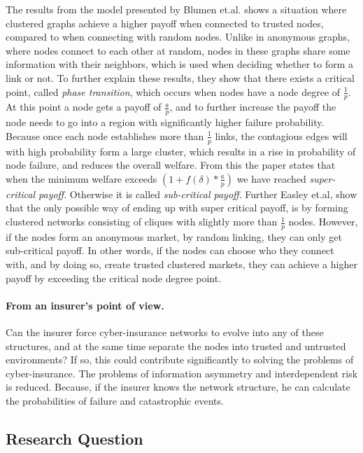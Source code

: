 The results from the model presented by Blumen et.al. shows a situation where clustered graphs achieve a higher payoff when connected to trusted nodes, compared to when connecting with random nodes. Unlike in anonymous graphs, where nodes connect to each other at random, nodes in these graphs share some information with their neighbors, which is used when deciding whether to form a link or not. 
To further explain these results, they show that there exists a critical point, called \textit{phase transition}, which occurs when nodes have a node degree of $\frac{1}{p}$. 
At this point a node gets a payoff of $\frac{a}{p}$, and to further increase the payoff the node needs to go into a region with significantly higher failure probability. 
Because once each node establishes more than $\frac{1}{p}$ links, the contagious edges will with high probability form a large cluster, which results in a rise in probability of node failure, and reduces the overall welfare.
From this the paper states that when the minimum welfare exceeds 
$(1+f(\delta)*\frac{a}{p})$
we have reached \textit{super-critical payoff}. Otherwise it is called \textit{sub-critical payoff}. 
Further Easley et.al, show that the only possible way of ending up with super critical payoff, is by forming clustered networks consisting of cliques with slightly more than $\frac{1}{p}$ nodes. 
However, if the nodes form an anonymous market, by random linking, they can only get sub-critical payoff. 
In other words, if the nodes can choose who they connect with, and by doing so, create trusted clustered markets, they can achieve a higher payoff by exceeding the critical node degree point. 

\paragraph{From an insurer's point of view.}

 Can the insurer force cyber-insurance networks to evolve into any of these structures, and at the same time separate the nodes into trusted and untrusted environments? 
If so, this could contribute significantly to solving the problems of cyber-insurance. The problems of information asymmetry and interdependent risk is reduced. Because, if the insurer knows the network structure, he can calculate the probabilities of failure and catastrophic events. 

\subsection{Research Question}


